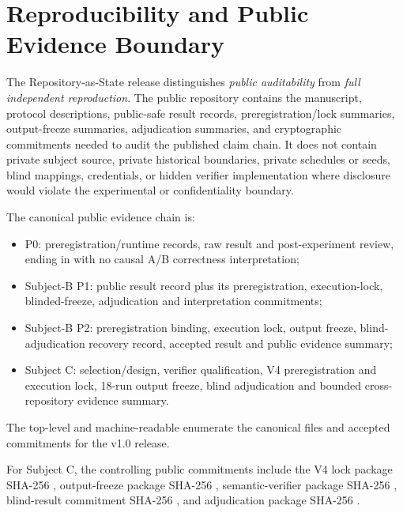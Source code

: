 \section{Reproducibility and Public Evidence Boundary}
\label{sec:reproducibility}

The Repository-as-State release distinguishes \emph{public auditability} from \emph{full independent reproduction}. The public repository contains the manuscript, protocol descriptions, public-safe result records, preregistration/lock summaries, output-freeze summaries, adjudication summaries, and cryptographic commitments needed to audit the published claim chain. It does not contain private subject source, private historical boundaries, private schedules or seeds, blind mappings, credentials, or hidden verifier implementation where disclosure would violate the experimental or confidentiality boundary.

The canonical public evidence chain is:
\begin{itemize}
    \item P0: preregistration/runtime records, raw result and post-experiment review, ending in \mixedstatus with no causal A/B correctness interpretation;
    \item Subject-B P1: public result record plus its preregistration, execution-lock, blinded-freeze, adjudication and interpretation commitments;
    \item Subject-B P2: preregistration binding, execution lock, output freeze, blind-adjudication recovery record, accepted result and public evidence summary;
    \item Subject C: selection/design, verifier qualification, V4 preregistration and execution lock, 18-run output freeze, blind adjudication and bounded cross-repository evidence summary.
\end{itemize}

The top-level  and machine-readable  enumerate the canonical files and accepted commitments for the v1.0 release.

For Subject C, the controlling public commitments include the V4 lock package SHA-256 , output-freeze package SHA-256 , semantic-verifier package SHA-256 , blind-result commitment SHA-256 , and adjudication package SHA-256 .

